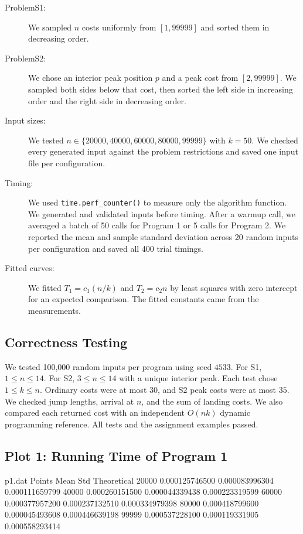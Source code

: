 \documentclass{article}
\begin{document}
\begin{description}
    \item[ProblemS1:] We sampled $n$ costs uniformly from $[1,99999]$ and sorted them in decreasing order.
    \item[ProblemS2:] We chose an interior peak position $p$ and a peak cost from $[2,99999]$. We sampled both sides below that cost, then sorted the left side in increasing order and the right side in decreasing order.
    \item[Input sizes:] We tested $n\in\{20000,40000,60000,80000,99999\}$ with $k=50$. We checked every generated input against the problem restrictions and saved one input file per configuration.
    \item[Timing:] We used \texttt{time.perf\_counter()} to measure only the algorithm function. We generated and validated inputs before timing. After a warmup call, we averaged a batch of 50 calls for Program 1 or 5 calls for Program 2. We reported the mean and sample standard deviation across 20 random inputs per configuration and saved all 400 trial timings.
    \item[Fitted curves:] We fitted $T_1=c_1(n/k)$ and $T_2=c_2n$ by least squares with zero intercept for an expected comparison. The fitted constants came from the measurements.
\end{description}

\subsection{Correctness Testing}
We tested 100,000 random inputs per program using seed $4533$. For S1, $1\le n\le14$. For S2, $3\le n\le14$ with a unique interior peak. Each test chose $1\le k\le n$. Ordinary costs were at most $30$, and S2 peak costs were at most $35$. We checked jump lengths, arrival at $n$, and the sum of landing costs. We also compared each returned cost with an independent $O(nk)$ dynamic programming reference. All tests and the assignment examples passed.

\subsection{Plot 1: Running Time of Program 1}
\begin{filecontents*}[overwrite]{p1.dat}
Points Mean Std Theoretical
20000 0.000125746500 0.000083996304 0.000111659799
40000 0.000260151500 0.000044339438 0.000223319599
60000 0.000377957200 0.000237132510 0.000334979398
80000 0.000418799600 0.000045493608 0.000446639198
99999 0.000537228100 0.000119331905 0.000558293414
\end{filecontents*}
\end{document}
